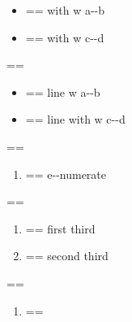 \documentclass{book}
\makeatletter
\newenvironment{Texinfopreformatted}{%
  \par\GNUTobeylines\obeyspaces\frenchspacing\parskip=\z@\parindent=\z@}{}
{\catcode`\^^M=13 \gdef\GNUTobeylines{\catcode`\^^M=13 \def^^M{\null\par}}}
\newenvironment{Texinfoindented}{\begin{list}{}{}\item\relax}{\end{list}}
\renewcommand{\_}{\Texinfounderscore\discretionary{}{}{}}
\makeatother
\begin{document}
{{\begin{Texinfoindented}
\begin{itemize}[label={}]
\item \begin{Texinfopreformatted}%
\ttfamily with w a{-}{-}b
\end{Texinfopreformatted}
\item \begin{Texinfopreformatted}%
\ttfamily with w c{-}{-}d
\end{Texinfopreformatted}
\end{itemize}
\begin{Texinfopreformatted}%
\ttfamily 
\end{Texinfopreformatted}
\begin{itemize}[label=\hbox{} on a line]
\item \begin{Texinfopreformatted}%
\ttfamily line w a{-}{-}b
\end{Texinfopreformatted}
\item \begin{Texinfopreformatted}%
\ttfamily line with w c{-}{-}d
\end{Texinfopreformatted}
\end{itemize}
\begin{Texinfopreformatted}%
\ttfamily 
\end{Texinfopreformatted}
\begin{enumerate}[start=1]
\item \begin{Texinfopreformatted}%
\ttfamily e{-}{-}numerate
\end{Texinfopreformatted}
\end{enumerate}
\begin{Texinfopreformatted}%
\ttfamily 
\end{Texinfopreformatted}
\begin{enumerate}[start=3]
\item \begin{Texinfopreformatted}%
\ttfamily first third
\end{Texinfopreformatted}
\item \begin{Texinfopreformatted}%
\ttfamily second third
\end{Texinfopreformatted}
\end{enumerate}
\begin{Texinfopreformatted}%
\ttfamily 
\end{Texinfopreformatted}
\begin{enumerate}[label=\alph*.]
\item \begin{Texinfopreformatted}%

\end{Texinfopreformatted}
\end{enumerate}
\end{Texinfoindented}}}
\end{document}
